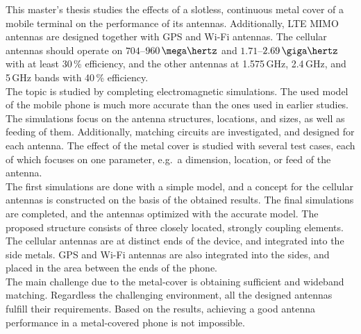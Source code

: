 This master's thesis studies the effects of a slotless, continuous metal cover of a mobile terminal on the performance of its antennas. Additionally, LTE MIMO antennas are designed together with GPS and Wi-Fi antennas. The cellular antennas should operate on $704$--$960\,\mega\hertz$ and $1.71$--$2.69\,\giga\hertz$ with at least 30\,\% efficiency, and the other antennas at 1.575\,GHz, 2.4\,GHz, and 5\,GHz bands with 40\,\% efficiency. \\

The topic is studied by completing electromagnetic simulations. The used model of the mobile phone is much more accurate than the ones used in earlier studies. The simulations focus on the antenna structures, locations, and sizes, as well as feeding of them. Additionally, matching circuits are investigated, and designed for each antenna. The effect of the metal cover is studied with several test cases, each of which focuses on one parameter, e.g.\ a dimension, location, or feed of the antenna. \\

The first simulations are done with a simple model, and a concept for the cellular antennas is constructed on the basis of the obtained results. The final simulations are completed, and the antennas optimized with the accurate model. The proposed structure consists of three closely located, strongly coupling elements. The cellular antennas are at distinct ends of the device, and integrated into the side metals. GPS and Wi-Fi antennas are also integrated into the sides, and placed in the area between the ends of the phone. \\

The main challenge due to the metal-cover is obtaining sufficient and wideband matching. Regardless the challenging environment, all the designed antennas fulfill their requirements. Based on the results, achieving a good antenna performance in a metal-covered phone is not impossible.